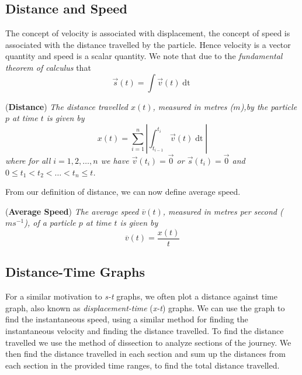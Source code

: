 \subsection{Distance and Speed}

The concept of velocity is associated with displacement, the concept of speed is associated with the distance travelled by the particle. Hence velocity is a vector quantity and speed is a scalar quantity. We note that due to the \textit{fundamental theorem of calculus} that 
\begin{equation*}
    \vec{s}(t) = \int \vec{v}(t) \mathop{\mathrm{d}t} 
\end{equation*}

\begin{definition}{(\textbf{Distance})}
\textit{The distance travelled $x(t)$, measured in metres ($m$),by the particle $p$ at time $t$ is given by }
\begin{equation}
    x(t) = \sum_{i = 1} ^ n \left|\int_{t_{i-1}}^{t_{i}} \vec{v}(t) \mathop{\mathrm{d}t}\right|
\end{equation}
\textit{where for all $i = 1, 2, \ldots, n$ we have $\vec{v}(t_i) = \vec{0}$ or $\vec{s}(t_i) = \vec{0}$ and $0 \leq t_1 < t_2 < \ldots < t_n \leq t$.}
\end{definition}
\noindent From our definition of distance, we can now define average speed. 
\begin{definition}{(\textbf{Average Speed})}
\textit{The average speed $\overline{v}(t)$, measured in metres per second ($ms^{-1}$), of a particle $p$ at time $t$ is given by}
\begin{equation}
    \overline{v}(t) = \frac{x(t)}{t}
\end{equation}
\end{definition}

\subsection{Distance-Time Graphs}

For a similar motivation to \textit{s-t} graphs, we often plot a distance against time graph, also known as \textit{displacement-time} (\textit{x-t}) graphs. We can use the graph to find the instantaneous speed, using a similar method for finding the instantaneous velocity and finding the distance travelled. To find the distance travelled we use the method of dissection to analyze sections of the journey. We then find the distance travelled in each section and sum up the distances from each section in the provided time ranges, to find the total distance travelled. 

